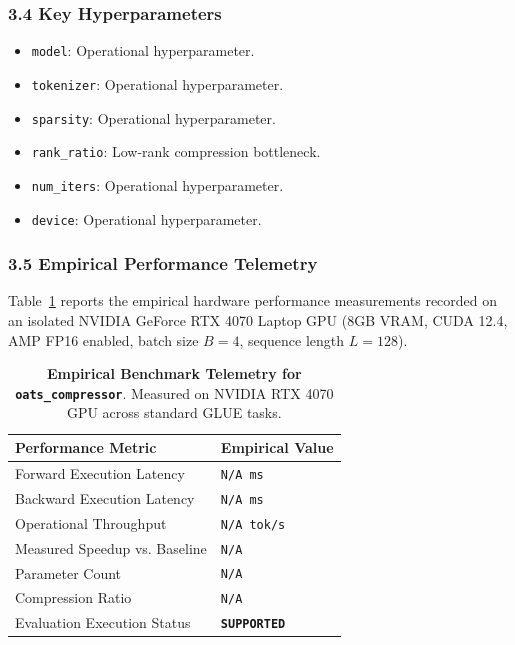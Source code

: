 \subsubsection*{3.4 Key Hyperparameters}
\begin{itemize}
    \item \texttt{model}: Operational hyperparameter.
    \item \texttt{tokenizer}: Operational hyperparameter.
    \item \texttt{sparsity}: Operational hyperparameter.
    \item \texttt{rank\_ratio}: Low-rank compression bottleneck.
    \item \texttt{num\_iters}: Operational hyperparameter.
    \item \texttt{device}: Operational hyperparameter.
\end{itemize}

\subsubsection*{3.5 Empirical Performance Telemetry}
Table~\ref{tab:telemetry_oats_compressor} reports the empirical hardware performance measurements recorded on an isolated NVIDIA GeForce RTX 4070 Laptop GPU (8GB VRAM, CUDA 12.4, AMP FP16 enabled, batch size $B=4$, sequence length $L=128$).

\begin{table}[h]
\centering
\small
\caption{\textbf{Empirical Benchmark Telemetry for \texttt{oats\_compressor}}. Measured on NVIDIA RTX 4070 GPU across standard GLUE tasks.}
\label{tab:telemetry_oats_compressor}
\begin{tabularx}{\columnwidth}{lX}
\toprule
\textbf{Performance Metric} & \textbf{Empirical Value} \\
\midrule
Forward Execution Latency & \texttt{N/A ms} \\
Backward Execution Latency & \texttt{N/A ms} \\
Operational Throughput & \texttt{N/A tok/s} \\
Measured Speedup vs. Baseline & \texttt{N/A} \\
Parameter Count & \texttt{N/A} \\
Compression Ratio & \texttt{N/A} \\
Evaluation Execution Status & \textbf{\texttt{SUPPORTED}} \\
\bottomrule
\end{tabularx}
\end{table}

